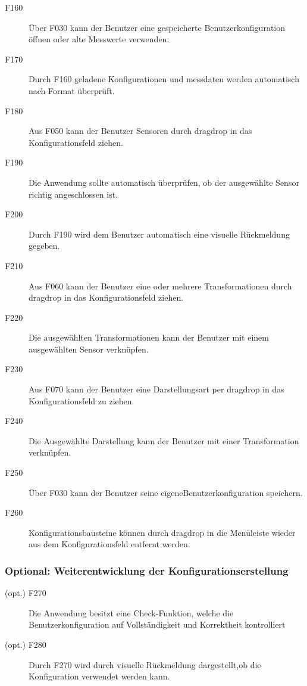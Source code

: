 \documentclass[parskip=full]{scrartcl}
\begin{document}
\begin{description}

\item[F160] Über F030 kann der Benutzer eine gespeicherte \gls{Benutzerkonfiguration} öffnen oder alte Messwerte verwenden.
\item[F170] Durch F160 geladene Konfigurationen und \gls{messdaten} werden automatisch nach Format überprüft.
\item[F180] Aus F050 kann der Benutzer Sensoren durch \gls{dragdrop} in das Konfigurationsfeld ziehen.
\item[F190] Die Anwendung sollte automatisch überprüfen, ob der ausgewählte Sensor richtig angeschlossen ist.
\item[F200] Durch F190 wird dem Benutzer automatisch eine visuelle Rückmeldung gegeben.
\item[F210] Aus F060 kann der Benutzer eine oder mehrere Transformationen durch \gls{dragdrop} in das Konfigurationsfeld ziehen.
\item[F220] Die ausgewählten Transformationen kann der Benutzer mit einem ausgewählten Sensor verknüpfen.
\item[F230] Aus F070 kann der Benutzer eine Darstellungsart per \gls{dragdrop} in das Konfigurationsfeld zu ziehen.
\item[F240] Die Ausgewählte Darstellung kann der Benutzer mit einer Transformation verknüpfen.
\item[F250] Über F030 kann der Benutzer seine eigene\gls{Benutzerkonfiguration} speichern.
\item[F260] Konfigurationsbausteine können durch \gls{dragdrop} in die Menüleiste wieder aus dem Konfigurationsfeld entfernt werden.

\end{description}

\subsubsection{Optional: Weiterentwicklung der Konfigurationserstellung}

\begin{description}

\item[(opt.) F270] Die Anwendung besitzt eine Check-Funktion, welche die \gls{Benutzerkonfiguration} auf Vollständigkeit und Korrektheit kontrolliert
\item[(opt.) F280] Durch F270 wird durch visuelle Rückmeldung dargestellt,ob die Konfiguration verwendet werden kann.

\end{description}
\end{document}
